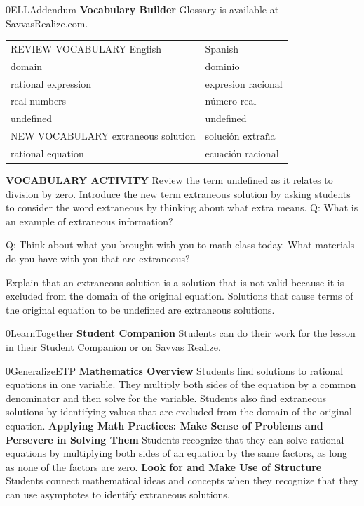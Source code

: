 \documentclass{article}
\newenvironment{te-addendum}[2]{}{}     %
\newcommand{\placeholder}[2]{}          %
\newcommand{\te}[1]{}                   %
\begin{document}
\begin{te-addendum}{0}{ELLAddendum}
\textbf{Vocabulary Builder}
Glossary is available at SavvasRealize.com.
\begin{tabular}{ll}
REVIEW VOCABULARY English & Spanish \\
domain & dominio \\
rational expression & expresion racional \\
real numbers & número real \\
undefined & undefined \\
NEW VOCABULARY extraneous solution & solución extraña \\
rational equation & ecuación racional \\
\end{tabular}
\textbf{VOCABULARY ACTIVITY}
Review the term undefined as it relates to division by zero. Introduce the new term extraneous solution by asking students to consider the word extraneous by thinking about what extra means.
Q: What is an example of extraneous information?
\te{No answer printed.}
Q: Think about what you brought with you to math class today. What materials do you have with you that are extraneous?
\te{No answer printed.}
Explain that an extraneous solution is a solution that is not valid because it is excluded from the domain of the original equation. Solutions that cause terms of the original equation to be undefined are extraneous solutions.
\end{te-addendum}
\begin{te-addendum}{0}{LearnTogether}
\textbf{Student Companion}
Students can do their work for the lesson in their Student Companion or on Savvas Realize.
\placeholder{illustration}{Student Companion cover: black background, glowing purple/blue circular sphere with connected cells, enVision Algebra 2 and Savvas at bottom.}
\end{te-addendum}
\begin{te-addendum}{0}{GeneralizeETP}
\textbf{Mathematics Overview}
Students find solutions to rational equations in one variable. They multiply both sides of the equation by a common denominator and then solve for the variable. Students also find extraneous solutions by identifying values that are excluded from the domain of the original equation.
\textbf{Applying Math Practices: Make Sense of Problems and Persevere in Solving Them}
Students recognize that they can solve rational equations by multiplying both sides of an equation by the same factors, as long as none of the factors are zero.
\textbf{Look for and Make Use of Structure}
Students connect mathematical ideas and concepts when they recognize that they can use asymptotes to identify extraneous solutions.
\end{te-addendum}
\end{document}
